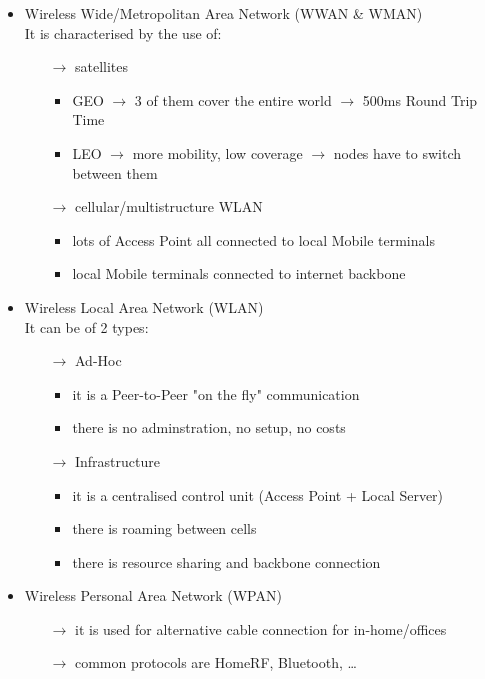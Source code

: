\begin{itemize}
    \item Wireless Wide/Metropolitan Area Network (WWAN \& WMAN)\\
    It is characterised by the use of:
    \begin{itemize}
        \item[$\rightarrow$] satellites
        \begin{itemize}
            \item GEO $\rightarrow$ 3 of them cover the entire world $\rightarrow$ 500ms Round Trip Time
            \item LEO $\rightarrow$ more mobility, low coverage $\rightarrow$ nodes have to switch\\between them
        \end{itemize}
        \item[$\rightarrow$] cellular/multistructure WLAN
        \begin{itemize}
            \item lots of Access Point all connected to local Mobile terminals
            \item local Mobile terminals connected to internet backbone
        \end{itemize}
    \end{itemize}
    \item Wireless Local Area Network (WLAN)\\[0.2cm]
    It can be of 2 types:
    \begin{itemize}
        \item[$\rightarrow$] Ad-Hoc
        \begin{itemize}
            \item it is a Peer-to-Peer "on the fly" communication
            \item there is no adminstration, no setup, no costs
        \end{itemize}
        \item[$\rightarrow$] Infrastructure
        \begin{itemize}
            \item it is a centralised control unit (Access Point + Local Server)
            \item there is roaming between cells
            \item there is resource sharing and backbone connection
        \end{itemize}
    \end{itemize}
    \item Wireless Personal Area Network (WPAN)
    \begin{itemize}
        \item[$\rightarrow$] it is used for alternative cable connection for in-home/offices
        \item[$\rightarrow$] common protocols are HomeRF, Bluetooth, \dots
    \end{itemize}
\end{itemize}

